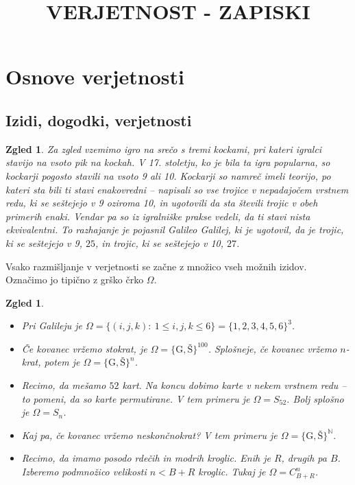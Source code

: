 \documentclass[10pt, a4paper]{article}
\newtheorem{zgled}[izr]{Zgled}
\newcommand{\N}{\mathbb {N}}
\begin{document}
\title{VERJETNOST - ZAPISKI}
\date{}
\maketitle

\section{Osnove verjetnosti}

\subsection{Izidi, dogodki, verjetnosti}

\begin{zgled}
    Za zgled vzemimo igro na srečo s tremi kockami, pri kateri igralci stavijo na vsoto
    pik na kockah. V 17. stoletju, ko je bila ta igra popularna, so kockarji pogosto stavili na vsoto 9 ali 10.
    Kockarji so namreč imeli teorijo, po kateri sta bili ti stavi enakovredni -- napisali so vse trojice v nepadajočem vrstnem
    redu, ki se seštejejo v 9 oziroma 10, in ugotovili da sta števili trojic v obeh primerih enaki. Vendar pa so iz igralniške prakse
    vedeli, da ti stavi nista ekvivalentni. To razhajanje je pojasnil Galileo Galilej, ki je ugotovil, da je trojic, ki se seštejejo v 9,
    $25$, in trojic, ki se seštejejo v 10, $27$.
\end{zgled}

Vsako razmišljanje v verjetnosti se začne z množico vseh možnih izidov. Označimo jo tipično z grško črko $\Omega$.

\begin{zgled}
    \begin{itemize}
        \item Pri Galileju je $\Omega = \{(i, j, k):\ 1 \leq i, j, k \leq 6\} = \{1, 2, 3, 4, 5, 6\}^3$.
        \item Če kovanec vržemo stokrat, je $\Omega = \{\mathrm{G}, \mathrm{Š}\}^{100}$. Splošneje, če kovanec vržemo $n$-krat,
        potem je $\Omega = \{\mathrm{G}, \mathrm{Š}\}^n$.
        \item Recimo, da mešamo $52$ kart. Na koncu dobimo karte v nekem vrstnem redu -- to pomeni, da so karte permutirane.
        V tem primeru je $\Omega = S_{52}$. Bolj splošno je $\Omega = S_n$.
        \item Kaj pa, če kovanec vržemo neskončnokrat? V tem primeru je $\Omega = \{\mathrm{G}, \mathrm{Š}\}^{\N}$.
        \item Recimo, da imamo posodo rdečih in modrih kroglic. Enih je $R$, drugih pa $B$. Izberemo podmnožico velikosti $n < B + R$
        kroglic. Tukaj je $\Omega = C_{B + R}^n$.
    \end{itemize}
\end{zgled}
\end{document}

